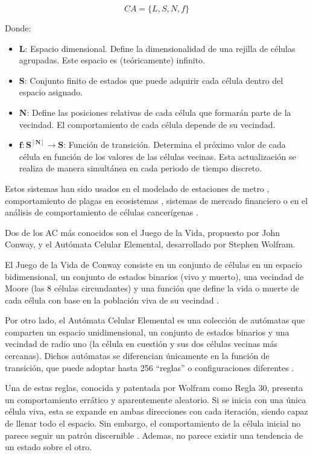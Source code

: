 \documentclass[12pt,twoside]{article}
\begin{document}
	\begin{equation*} CA = \{L, S, N, f\} \end{equation*}
	
	Donde: 
	\begin{itemize} \item $\boldsymbol{L}$: Espacio dimensional. Define la dimensionalidad de una rejilla de células agrupadas. Este espacio es (teóricamente) infinito.

		\item $\boldsymbol{S}$: Conjunto finito de estados que puede adquirir cada célula dentro del espacio asignado.
		
		\item $\boldsymbol{N}$: Define las posiciones relativas de cada célula que formarán parte de la vecindad. El comportamiento de cada célula depende de su vecindad.
		
		\item $\boldsymbol{f : S^{[N]} \rightarrow S}$: Función de transición. Determina el próximo valor de cada célula en función de los valores de las células vecinas. Esta actualización se realiza de manera simultánea en cada periodo de tiempo discreto.
	\end{itemize}
	
	Estos sistemas han sido usados en el modelado de estaciones de metro \cite{b2}, comportamiento de plagas en ecosistemas \cite{b3}, sistemas de mercado financiero \cite{b4} o en el análisis de comportamiento de células cancerígenas \cite{b5}.
	
	Dos de los AC más conocidos son el Juego de la Vida, propuesto por John Conway, y el Autómata Celular Elemental, desarrollado por Stephen Wolfram.
	
	El Juego de la Vida de Conway consiste en un conjunto de células en un espacio bidimensional, un conjunto de estados binarios (vivo y muerto), una vecindad de Moore (las 8 células circundantes) y una función que define la vida o muerte de cada célula con base en la población viva de su vecindad \cite{b6}.
	
	Por otro lado, el Autómata Celular Elemental es una colección de autómatas que comparten un espacio unidimensional, un conjunto de estados binarios y una vecindad de radio uno (la célula en cuestión y sus dos células vecinas más cercanas). Dichos autómatas se diferencian únicamente en la función de transición, que puede adoptar hasta 256 ``reglas'' o configuraciones diferentes \cite{b7}.
	
	Una de estas reglas, conocida y patentada por Wolfram como Regla 30, presenta un comportamiento errático y aparentemente aleatorio. Si se inicia con una única célula viva, esta se expande en ambas direcciones con cada iteración, siendo capaz de llenar todo el espacio. Sin embargo, el comportamiento de la célula inicial no parece seguir un patrón discernible \cite{b8}. Ademas, no parece existir una tendencia de un estado sobre el otro.
	
\end{document}
